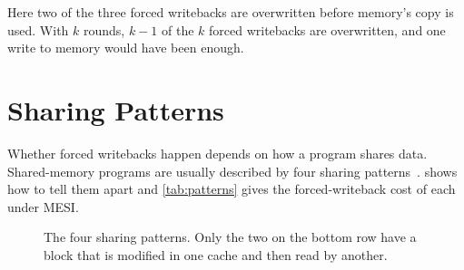 Here two of the three forced writebacks are overwritten before memory's copy is
used. With $k$ rounds, $k-1$ of the $k$ forced writebacks are overwritten, and one
write to memory would have been enough.

\section{Sharing Patterns}
\label{sec:dirty-patterns}
%

Whether forced writebacks happen depends on how a program shares data.
Shared-memory programs are usually described by four sharing
patterns~\cite{culler1999parallel}. 
shows how to tell them apart and \cref{tab:patterns} gives the forced-writeback
cost of each under MESI.

\begin{figure}[htbp]
\centering
{}
\caption[Decision tree: classifying a sharing pattern]{The four sharing patterns.
Only the two on the bottom row have a block that is modified in one cache and then
read by another.}
\label{fig:pattern-tree}
\end{figure}

